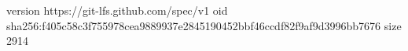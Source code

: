 version https://git-lfs.github.com/spec/v1
oid sha256:f405c58c3f755978cea9889937e2845190452bbf46ccdf82f9af9d3996bb7676
size 2914

